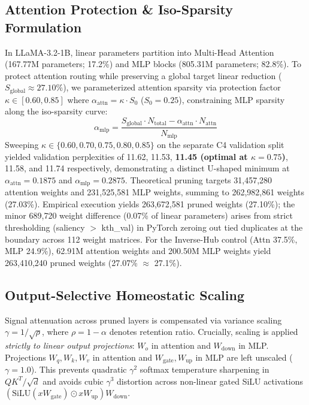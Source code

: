 \documentclass[conference]{IEEEtran}
\begin{document}
\subsection{Attention Protection \& Iso-Sparsity Formulation}
In LLaMA-3.2-1B, linear parameters partition into Multi-Head Attention (167.77M parameters; 17.2\%) and MLP blocks (805.31M parameters; 82.8\%). To protect attention routing while preserving a global target linear reduction ($S_{\text{global}} \approx 27.10\%$), we parameterized attention sparsity via protection factor $\kappa \in [0.60, 0.85]$ where $\alpha_{\text{attn}} = \kappa \cdot S_0$ ($S_0 = 0.25$), constraining MLP sparsity along the iso-sparsity curve:
\begin{equation}
\alpha_{\text{mlp}} = \frac{S_{\text{global}} \cdot N_{\text{total}} - \alpha_{\text{attn}} \cdot N_{\text{attn}}}{N_{\text{mlp}}}
\end{equation}
Sweeping $\kappa \in \{0.60, 0.70, 0.75, 0.80, 0.85\}$ on the separate C4 validation split yielded validation perplexities of 11.62, 11.53, \textbf{11.45 (optimal at $\kappa = 0.75$)}, 11.58, and 11.74 respectively, demonstrating a distinct U-shaped minimum at $\alpha_{\text{attn}} = 0.1875$ and $\alpha_{\text{mlp}} = 0.2875$. Theoretical pruning targets 31,457,280 attention weights and 231,525,581 MLP weights, summing to 262,982,861 weights (27.03\%). Empirical execution yields 263,672,581 pruned weights (27.10\%); the minor 689,720 weight difference (0.07\% of linear parameters) arises from strict thresholding (saliency $>$ kth\_val) in PyTorch zeroing out tied duplicates at the boundary across 112 weight matrices. For the Inverse-Hub control (Attn 37.5\%, MLP 24.9\%), 62.91M attention weights and 200.50M MLP weights yield 263,410,240 pruned weights (27.07\% $\approx$ 27.1\%).

\subsection{Output-Selective Homeostatic Scaling}
Signal attenuation across pruned layers is compensated via variance scaling $\gamma = 1 / \sqrt{\rho}$, where $\rho = 1 - \alpha$ denotes retention ratio. Crucially, scaling is applied \textit{strictly to linear output projections}: $W_o$ in attention and $W_{\text{down}}$ in MLP. Projections $W_q, W_k, W_v$ in attention and $W_{\text{gate}}, W_{\text{up}}$ in MLP are left unscaled ($\gamma = 1.0$). This prevents quadratic $\gamma^2$ softmax temperature sharpening in $QK^T/\sqrt{d}$ and avoids cubic $\gamma^3$ distortion across non-linear gated SiLU activations $(\text{SiLU}(x W_{\text{gate}}) \odot x W_{\text{up}}) W_{\text{down}}$.
\end{document}
